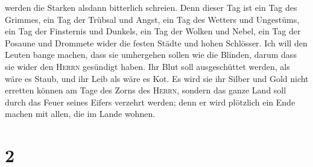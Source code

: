 werden die Starken alsdann bitterlich schreien.  Denn
dieser Tag ist ein Tag des Grimmes, ein Tag der Trübsal und Angst, ein
Tag des Wetters und Ungestüms, ein Tag der Finsternis und Dunkels, ein
Tag der Wolken und Nebel,  ein Tag der Posaune und
Drommete wider die festen Städte und hohen Schlösser. 
Ich will den Leuten bange machen, dass sie umhergehen sollen wie die
Blinden, darum dass sie wider den \textsc{Herrn} gesündigt haben. Ihr
Blut soll ausgeschüttet werden, als wäre es Staub, und ihr Leib als wäre
es Kot.  Es wird sie ihr Silber und Gold nicht erretten
können am Tage des Zorns des \textsc{Herrn}, sondern das ganze Land soll
durch das Feuer seines Eifers verzehrt werden; denn er wird plötzlich
ein Ende machen mit allen, die im Lande wohnen.

\hypertarget{section-1}{%
\section{2}\label{section-1}}

